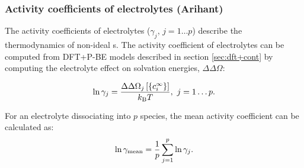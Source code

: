 \documentclass[../main.tex]{subfiles}
\begin{document}
\subsubsection{Activity coefficients of electrolytes (Arihant)}
\label{sec:tf}

The activity coefficients of electrolytes ($\gamma_j$, $j=1\dots p$) describe the thermodynamics of non-ideal s.\cite{Atkins2014} The activity coefficient of electrolytes can be computed from DFT+P-BE models described in section \ref{sec:dft+cont} by computing the electrolyte effect on solvation energies, $\Delta\Delta\Omega$:\cite{Ringe2016, Dziedzic2020}







\begin{equation}
    \label{eq:activityj}
   \ln{\gamma_j}  =\frac{\Delta\Delta\Omega_j\left[\{c_i^{\infty}\}\right]}{k_{\textrm{B}} T}, \ j=1\dots p.
\end{equation}

For an electrolyte dissociating into $p$ species, the mean activity coefficient can be calculated as:
\begin{equation}
    \label{eq:activitymean}
    \ln \gamma_{\rm mean} = \frac{1}{p}\sum_{j=1}^p \ln \gamma_j.
\end{equation}
\end{document}
